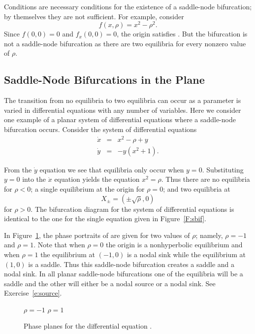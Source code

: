 Conditions  are necessary conditions for the existence of a 
saddle-node bifurcation; by themselves they are not sufficient.  For example, 
consider
\[
f(x,\rho) = x^2 -\rho^2.
\]
Since $f(0,0)=0$ and $f_x(0,0)=0$, the origin satisfies .  But 
the bifurcation is not a saddle-node bifurcation as there 
are two equilibria for every nonzero value of $\rho$.

\subsection*{Saddle-Node Bifurcations in the Plane}

The transition from no equilibria to two equilibria can occur as a 
parameter is varied in differential equations with any number of 
variables.  Here we consider one example of a planar system of 
differential equations where a saddle-node bifurcation occurs.
Consider the system of differential equations 
\begin{equation*}  \label{E:ssys}
\begin{array}{rcl}
\dot{x} & = & x^2 - \rho + y \\
\dot{y} & = & -y(x^2+1).  \end{array}
\end{equation*}

From the $\dot{y}$ equation we see that equilibria only occur 
when $y=0$.  Substituting $y=0$ into the $\dot{x}$ equation yields
the equation $x^2=\rho$.   Thus there are no equilibria for $\rho<0$;
a single equilibrium at the origin for $\rho=0$; and two equilibria
at 
\[
X_{\pm}=(\pm\sqrt{\rho},0)
\]
for $\rho>0$.  The bifurcation diagram 
for the system of differential equations  is identical to
the one for the single equation  given in Figure~\ref{F:sbif}.

In Figure~\ref{F:ssys}, the phase portraits of  are given for 
two values of $\rho$; namely, $\rho=-1$ and $\rho=1$.  Note that when 
$\rho=0$ the origin is a nonhyperbolic 
equilibrium and when $\rho=1$
the equilibrium at $(-1,0)$ is a nodal sink 
while the equilibrium at 
$(1,0)$ is a saddle.  
Thus this saddle-node bifurcation creates a saddle 
and a nodal sink.  In all planar saddle-node bifurcations one of the 
equilibria will be a saddle and the other will either be a nodal source 
or a nodal sink.  See Exercise~\ref{e:source}.

\begin{figure}[htb]
           \centerline{%
	   }
		\vspace*{-0.2in}		
		\hspace{1.3in} $\rho=-1$ \hspace{2.1in} $\rho=1$
   \caption{Phase planes for the differential equation \protect{}.}
           \label{F:ssys}
\end{figure}

